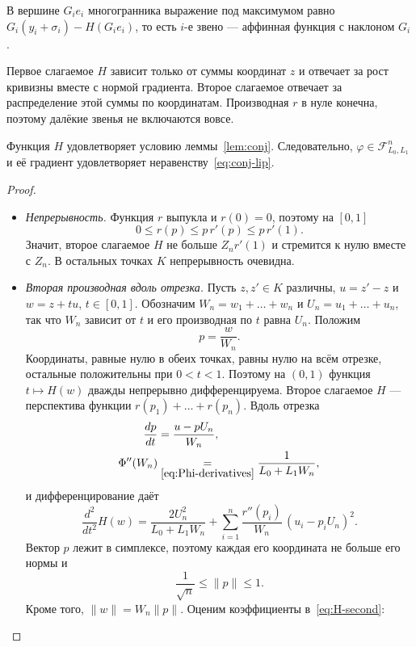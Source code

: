 \documentclass[11pt,a4paper]{article}
\newcommand{\F}{\mathcal F}
\newcommand{\norm}[1]{\|#1\|}
\newcommand{\by}[2]{\mathrel{\underset{#2}{#1}}}
\begin{document}
В вершине $G_ie_i$ многогранника выражение под максимумом равно $G_i(y_i+\sigma_i)-H(G_ie_i)$, то есть $i$-е звено --- аффинная функция с наклоном $G_i$.

Первое слагаемое $H$ зависит только от суммы координат $z$ и отвечает за рост кривизны вместе с нормой градиента. Второе слагаемое отвечает за распределение этой суммы по координатам. Производная $r$ в нуле конечна, поэтому далёкие звенья не включаются вовсе.

\begin{lemma}\label{lem:ord-class}
Функция $H$ удовлетворяет условию леммы~\ref{lem:conj}. Следовательно, $\varphi\in\F_{L_0,L_1}^n$ и её градиент удовлетворяет неравенству~\eqref{eq:conj-lip}.
\end{lemma}

\begin{proof}
\leavevmode
\begin{itemize}
\item \emph{Непрерывность.} Функция $r$ выпукла и $r(0)=0$, поэтому на $[0,1]$
\[
 0\le r(p)\le p\,r'(p)\le p\,r'(1) .
\]
Значит, второе слагаемое $H$ не больше $Z_nr'(1)$ и стремится к нулю вместе с $Z_n$. В остальных точках $K$ непрерывность очевидна.
\item \emph{Вторая производная вдоль отрезка.} Пусть $z,z'\in K$ различны, $u=z'-z$ и $w=z+tu$, $t\in[0,1]$. Обозначим $W_n=w_1+\dots+w_n$ и $U_n=u_1+\dots+u_n$, так что $W_n$ зависит от $t$ и его производная по $t$ равна $U_n$. Положим
\[
 p=\frac w{W_n} .
\]
Координаты, равные нулю в обеих точках, равны нулю на всём отрезке, остальные положительны при $0<t<1$. Поэтому на $(0,1)$ функция $t\mapsto H(w)$ дважды непрерывно дифференцируема. Второе слагаемое $H$ --- перспектива функции $r(p_1)+\dots+r(p_n)$. Вдоль отрезка
\begin{align*}
 \frac{dp}{dt}&=\frac{u-pU_n}{W_n},\\
 \Phi''(W_n)&\by{=}{\eqref{eq:Phi-derivatives}}\frac1{L_0+L_1W_n},
\end{align*}
и дифференцирование даёт
\begin{equation}\label{eq:H-second}
 \frac{d^2}{dt^2}H(w)=\frac{2U_n^2}{L_0+L_1W_n}+\sum_{i=1}^n\frac{r''(p_i)}{W_n}\,(u_i-p_iU_n)^2 .
\end{equation}
Вектор $p$ лежит в симплексе, поэтому каждая его координата не больше его нормы и
\begin{equation}\label{eq:simplex-p}
 \frac1{\sqrt n}\le\norm p\le1 .
\end{equation}
Кроме того, $\norm w=W_n\norm p$. Оценим коэффициенты в~\eqref{eq:H-second}:

\end{itemize}
\end{proof}
\end{document}
